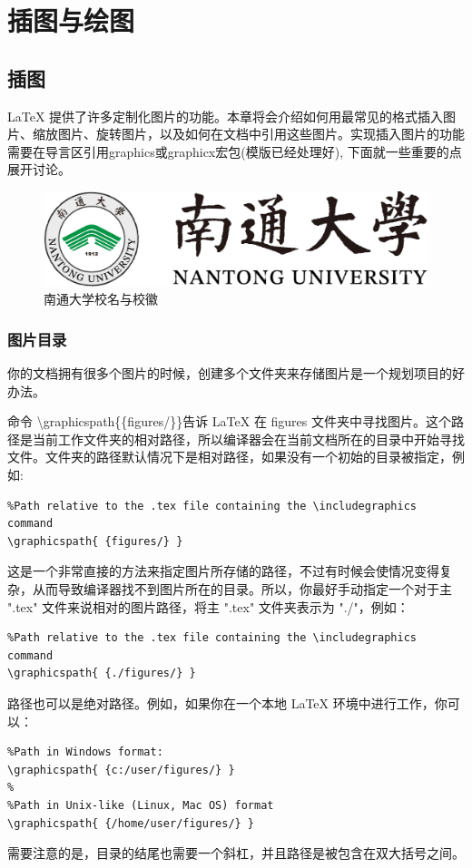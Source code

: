 \chapter{插图与绘图}\label{cha:plotting}
\section{插图}
\LaTeX{} 提供了许多定制化图片的功能。本章将会介绍如何用最常见的格式插入图片、缩放图片、旋转图片，以及如何在文档中引用这些图片。实现插入图片的功能需要在导言区引用graphics或graphicx宏包(模版已经处理好), 下面就一些重要的点展开讨论。
\begin{figure}[!hpbt]
    \centering
    \includegraphics[scale=0.25]{ntu-badgenamelogo.png}
    \caption[南通大学校名与校徽]{\enspace 南通大学校名与校徽}
    \label{fig:ntu-logo}
\end{figure}

\subsection{图片目录}
你的文档拥有很多个图片的时候，创建多个文件夹来存储图片是一个规划项目的好办法。

命令 \backslash graphicspath\{\{figures/\}\}告诉 \LaTeX{} 在 figures 文件夹中寻找图片。这个路径是当前工作文件夹的相对路径，所以编译器会在当前文档所在的目录中开始寻找文件。文件夹的路径默认情况下是相对路径，如果没有一个初始的目录被指定，例如:
\begin{verbatim}
%Path relative to the .tex file containing the \includegraphics command
\graphicspath{ {figures/} }
\end{verbatim}

这是一个非常直接的方法来指定图片所存储的路径，不过有时候会使情况变得复杂，从而导致编译器找不到图片所在的目录。所以，你最好手动指定一个对于主 ".tex" 文件来说相对的图片路径，将主 ".tex" 文件夹表示为 "./"，例如：
\begin{verbatim}
%Path relative to the .tex file containing the \includegraphics command
\graphicspath{ {./figures/} }
\end{verbatim}

路径也可以是绝对路径。例如，如果你在一个本地 \LaTeX{} 环境中进行工作，你可以：
\begin{verbatim}
%Path in Windows format:
\graphicspath{ {c:/user/figures/} }
%
%Path in Unix-like (Linux, Mac OS) format
\graphicspath{ {/home/user/figures/} }
\end{verbatim}
需要注意的是，目录的结尾也需要一个斜杠，并且路径是被包含在双大括号之间。

